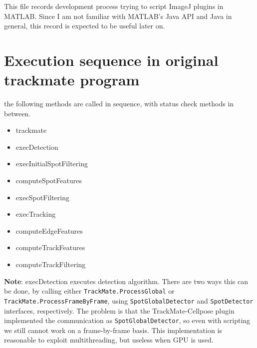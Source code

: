 \documentclass[11pt]{article}
\author{Yantao Xia}
\date{\textit{<2022-05-17 Tue>}}
\title{}
\begin{document}
\tableofcontents

This file records development process trying to script ImageJ plugins in MATLAB. Since I am not familiar with MATLAB's Java API and Java in general, this record is expected to be useful later on. 

\section{Execution sequence in original trackmate program}
\label{sec:org950d70c}
the following methods are called in sequence, with status check methods in between.
\begin{itemize}
\item trackmate
\item execDetection
\item execInitialSpotFiltering
\item computeSpotFeatures
\item execSpotFiltering
\item execTracking
\item computeEdgeFeatures
\item computeTrackFeatures
\item computeTrackFiltering
\end{itemize}

\textbf{Note}: execDetection executes detection algorithm. There are two ways this can be done, by calling either \texttt{TrackMate.ProcessGlobal} or
\texttt{TrackMate.ProcessFrameByFrame}, using \texttt{SpotGlobalDetector} and \texttt{SpotDetector} interfaces, respectively. 
The problem is that the TrackMate-Cellpose plugin implemented the communication as \texttt{SpotGlobalDetector}, so even with scripting we still cannot work on a frame-by-frame basis. This implementation is reasonable to exploit multithreading, but useless when GPU is used.
\end{document}
